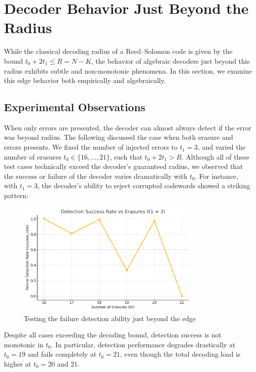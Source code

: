 \documentclass[11pt]{article}
\begin{document}
\section{Decoder Behavior Just Beyond the Radius}
\label{sec:radius-edge}

While the classical decoding radius of a Reed--Solomon code is given by the bound \( t_0 + 2t_1 \leq R = N - K \), the behavior of algebraic decoders just beyond this radius exhibits subtle and non-monotonic phenomena. In this section, we examine this edge behavior both empirically and algebraically.

\subsection{Experimental Observations}
When only errors are presented, the decoder can almost always detect if the error was beyond radius. The following discussed the case when both erasure and errors presents. We fixed the number of injected errors to \( t_1 = 3 \), and varied the number of erasures \( t_0 \in \{16, \ldots, 21\} \), such that \( t_0 + 2t_1 > R \). Although all of these test cases technically exceed the decoder's guaranteed radius, we observed that the success or failure of the decoder varies dramatically with \( t_0 \). For instance, with \( t_1 = 3 \), the decoder’s ability to reject corrupted codewords showed a striking pattern:

\begin{figure}[!h]
    \centering
	\includegraphics[width=0.8\textwidth]{fig/edge_test.png}
    \caption{Testing the failure detection ability just beyond the edge}
\end{figure}
Despite all cases exceeding the decoding bound, detection success is not monotonic in \( t_0 \). In particular, detection performance degrades drastically at \( t_0 = 19 \) and fails completely at \( t_0 = 21 \), even though the total decoding load is higher at \( t_0 = 20 \) and \( 21 \).
\end{document}
